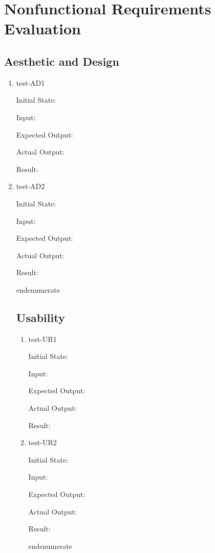 \documentclass[12pt, titlepage]{article}
\begin{document}
\section{Nonfunctional Requirements Evaluation} \label{section:4}

\subsection{Aesthetic and Design} \label{section:4.1}

\begin{enumerate}

  \item{test-AD1} \label{test-AD1}

  Initial State:

  Input:

  Expected Output:

  Actual Output:

  Result:

  \item{test-AD2} \label{test-AD2}

  Initial State:

  Input:

  Expected Output:

  Actual Output:

  Result:

end{enumerate}

\subsection{Usability} \label{section:4.2}

\begin{enumerate}

  \item{test-UR1} \label{test-UR1}

  Initial State:

  Input:

  Expected Output:

  Actual Output:

  Result:

  \item{test-UR2} \label{test-UR2}

  Initial State:

  Input:

  Expected Output:

  Actual Output:

  Result:

end{enumerate}


\end{enumerate}
\end{enumerate}
\end{document}
